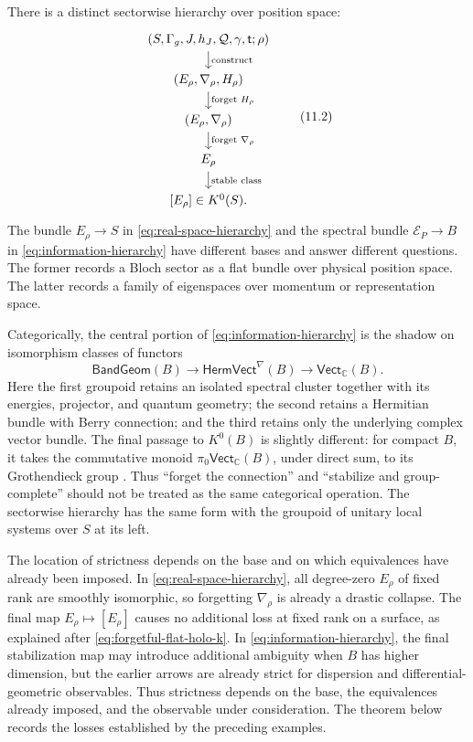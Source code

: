 \documentclass[11pt]{article}
\theoremstyle{definition}
\theoremstyle{remark}
\newcommand{\CC}{\mathbb C}
\begin{document}
There is a distinct sectorwise hierarchy over position space:
\[
\begin{tikzcd}[row sep=1.4em]
(S,\Gamma_g,J,h_J,\mathcal Q,\gamma,\mathsf t;\rho)
  \arrow[d, "\text{construct}"]\\
(E_\rho,\nabla_\rho,H_\rho)
  \arrow[d, "\text{forget }H_\rho"]\\
(E_\rho,\nabla_\rho)
  \arrow[d, "\text{forget }\nabla_\rho"]\\
{E_\rho}
  \arrow[d, "\text{stable class}"]\\
{[E_\rho]\in K^0(S)}.
\end{tikzcd}
\tag{11.2}\label{eq:real-space-hierarchy}
\]
The bundle \(E_\rho\to S\) in \eqref{eq:real-space-hierarchy} and the spectral
bundle \(\mathscr E_P\to B\) in \eqref{eq:information-hierarchy} have
different bases and answer different questions.  The former records a Bloch
sector as a flat bundle over physical position space.  The latter records a
family of eigenspaces over momentum or representation space.

Categorically, the central portion of
\eqref{eq:information-hierarchy} is the shadow on isomorphism classes of
functors
\[
 \mathsf{BandGeom}(B)
   \longrightarrow
 \mathsf{HermVect}^{\nabla}(B)
   \longrightarrow
 \mathsf{Vect}_{\CC}(B).
\]
Here the first groupoid retains an isolated spectral cluster together with
its energies, projector, and quantum geometry; the second retains a Hermitian
bundle with Berry connection; and the third retains only the underlying
complex vector bundle.  The final passage to \(K^0(B)\) is slightly
different: for compact \(B\), it takes the commutative monoid
\(\pi_0\mathsf{Vect}_{\CC}(B)\), under direct sum, to its Grothendieck group
\cite{AtiyahKTheory,KaroubiKTheory}.  Thus ``forget the connection'' and
``stabilize and group-complete'' should not be treated as the same categorical
operation.  The sectorwise hierarchy has the same form with the groupoid of
unitary local systems over \(S\) at its left.

The location of strictness depends on the base and on which equivalences have
already been imposed.  In \eqref{eq:real-space-hierarchy}, all degree-zero
\(E_\rho\) of fixed rank are smoothly isomorphic, so forgetting
\(\nabla_\rho\) is already a drastic collapse.  The final map
\(E_\rho\mapsto[E_\rho]\) causes no additional loss at fixed rank on a
surface, as explained after \eqref{eq:forgetful-flat-holo-k}.  In
\eqref{eq:information-hierarchy}, the final stabilization map may introduce
additional ambiguity when \(B\) has higher dimension, but the earlier arrows
are already strict for dispersion and differential-geometric observables.
Thus strictness depends on the base, the equivalences already imposed, and the
observable under consideration.  The theorem below records the losses
established by the preceding examples.
\end{document}
